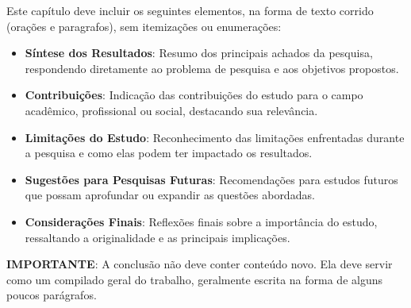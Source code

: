 


Este capítulo deve incluir os seguintes elementos, na forma de texto corrido (orações e paragrafos), sem itemizações ou enumerações:

\begin{itemize}
    \item \textbf{Síntese dos Resultados}: Resumo dos principais achados da pesquisa, respondendo diretamente ao problema de pesquisa e aos objetivos propostos.
    \item \textbf{Contribuições}: Indicação das contribuições do estudo para o campo acadêmico, profissional ou social, destacando sua relevância.
    \item \textbf{Limitações do Estudo}: Reconhecimento das limitações enfrentadas durante a pesquisa e como elas podem ter impactado os resultados.
    \item \textbf{Sugestões para Pesquisas Futuras}: Recomendações para estudos futuros que possam aprofundar ou expandir as questões abordadas.
    \item \textbf{Considerações Finais}: Reflexões finais sobre a importância do estudo, ressaltando a originalidade e as principais implicações.
\end{itemize}

\textbf{IMPORTANTE}: A conclusão não deve conter conteúdo novo. Ela deve servir como um compilado geral do trabalho, geralmente escrita na forma de alguns poucos parágrafos.
